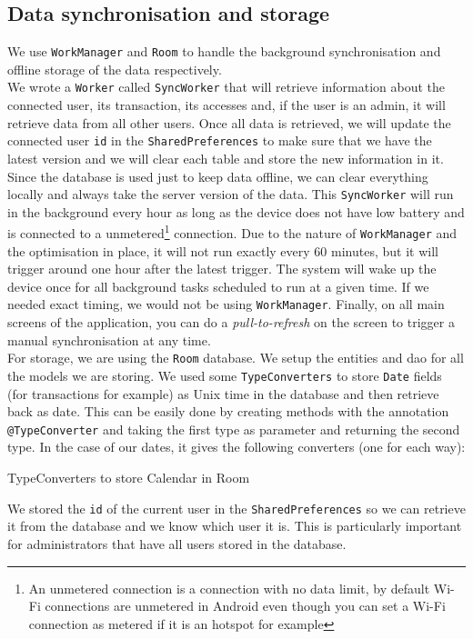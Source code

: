 \documentclass[twoside, openright,11pt,a4paper]{book}
\newenvironment{code}{\captionsetup{type=listing}}{}
\begin{document}
\subsection{Data synchronisation and storage}
We use \verb+WorkManager+ and \verb+Room+ to handle the background synchronisation and offline storage of the data respectively. \\

We wrote a \verb+Worker+ called \verb+SyncWorker+ that will retrieve information about the connected user, its transaction, its accesses and, if the user is an admin, it will retrieve data from all other users. Once all data is retrieved, we will update the connected user \verb+id+ in the \verb+SharedPreferences+ to make sure that we have the latest version and we will clear each table and store the new information in it. Since the database is used just to keep data offline, we can clear everything locally and always take the server version of the data. This \verb+SyncWorker+ will run in the background every hour as long as the device does not have low battery and is connected to a unmetered\footnote{An unmetered connection is a connection with no data limit, by default Wi-Fi connections are unmetered in Android even though you can set a Wi-Fi connection as metered if it is an hotspot for example} connection. Due to the nature of \verb+WorkManager+ and the optimisation in place, it will not run exactly every 60 minutes, but it will trigger around one hour after the latest trigger. The system will wake up the device once for all background tasks scheduled to run at a given time. If we needed exact timing, we would not be using \verb+WorkManager+. Finally, on all main screens of the application, you can do a \emph{pull-to-refresh} on the screen to trigger a manual synchronisation at any time. \\

For storage, we are using the \verb+Room+ database. We setup the entities and \gls{dao} for all the models we are storing. We used some \verb+TypeConverters+ to store \verb+Date+ fields (for transactions for example) as Unix time in the database and then retrieve back as date. This can be easily done by creating methods with the annotation \verb+@TypeConverter+ and taking the first type as parameter and returning the second type. In the case of our dates, it gives the following converters (one for each way):
\begin{code}
	\caption{TypeConverters to store Calendar in Room}
\end{code}
We stored the \verb+id+ of the current user in the \verb+SharedPreferences+ so we can retrieve it from the database and we know which user it is. This is particularly important for administrators that have all users stored in the database.
\end{document}
